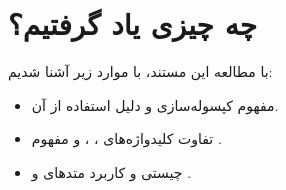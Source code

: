 \section{چه چیزی یاد گرفتیم؟}

با مطالعه این مستند، با موارد زیر آشنا شدیم:

\begin{itemize}
\tightlist
\item
  مفهوم کپسوله‌سازی  و دلیل استفاده از آن.
\item
  تفاوت کلیدواژه‌های  ،  ،
   و مفهوم  .
\item
  چیستی و کاربرد متدهای  و  .
\end{itemize}
	
	
	
	
